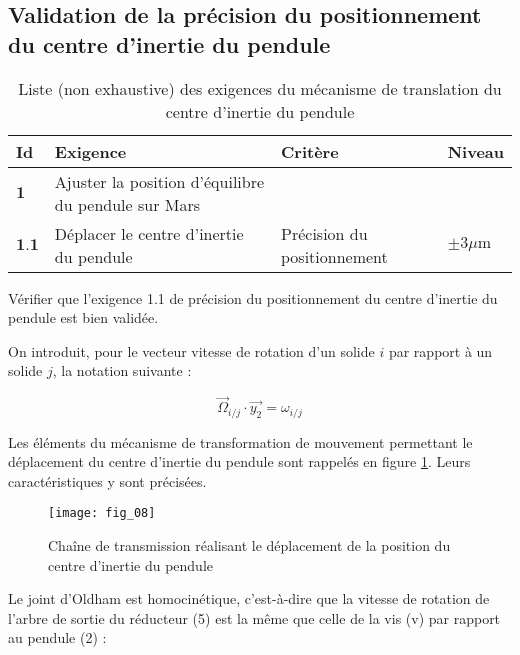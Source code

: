 \subsection{Validation de la précision du positionnement du centre d'inertie du pendule}

\begin{table}[!h]
\centering
\begin{tabular}{llll}
\hline
Id & Exigence & Critère & Niveau \\
\hline
$\mathbf{1}$ & Ajuster la position d'équilibre du pendule sur Mars &  &  \\
\hline
$\mathbf{1 . 1}$ & Déplacer le centre d'inertie du pendule & Précision du positionnement & $\pm 3 \mu \mathrm{m}$ \\
\hline
\end{tabular}
\caption{\label{ccmp2023_tab_01} Liste (non exhaustive) des exigences du mécanisme de translation du centre d'inertie du pendule}
\end{table}

\begin{obj}
Vérifier que l'exigence 1.1 de précision du positionnement du centre d'inertie du pendule est bien validée.
\end{obj}

On introduit, pour le vecteur vitesse de rotation d'un solide $i$ par rapport à un solide $j$, la notation suivante :

$$
\vec{\Omega}_{i / j} \cdot \overrightarrow{y_{2}}=\omega_{i / j}
$$

Les éléments du mécanisme de transformation de mouvement permettant le déplacement du centre d'inertie du pendule sont rappelés en figure \ref{ccmp2023_fig_08}. Leurs caractéristiques y sont précisées.

\begin{figure}[!h]
\centering
\texttt{[image: fig\_08]}
\caption{\label{ccmp2023_fig_08} Chaîne de transmission réalisant le déplacement de la position du centre d'inertie du pendule}
\end{figure}



Le joint d'Oldham est homocinétique, c'est-à-dire que la vitesse de rotation de l'arbre de sortie du réducteur (5) est la même que celle de la vis (v) par rapport au pendule (2) :

